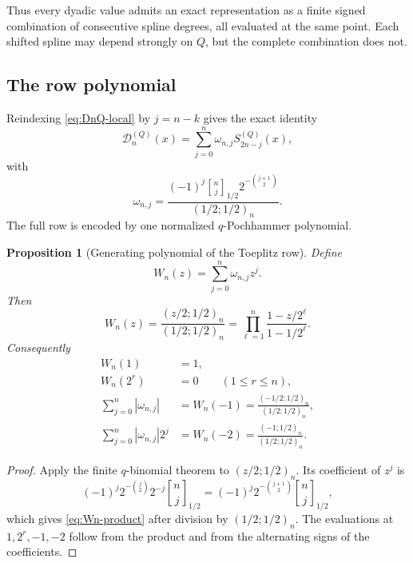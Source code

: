 \documentclass[11pt,oneside]{article}
\newtheorem{proposition}[theorem]{Proposition}
\theoremstyle{definition}
\theoremstyle{remark}
\newcommand{\qbinom}[3]{\genfrac{[}{]}{0pt}{}{#1}{#2}_{#3}}
\begin{document}
Thus every dyadic value admits an exact representation as a finite signed combination of
consecutive spline degrees, all evaluated at the same point.  Each shifted spline may depend
strongly on $Q$, but the complete combination does not.

\subsection{The row polynomial}

Reindexing \eqref{eq:DnQ-local} by $j=n-k$ gives the exact identity
\begin{equation}
 \mathcal D_n^{(Q)}(x)=
 \sum_{j=0}^{n}\omega_{n,j}S_{2n-j}^{(Q)}(x),              \label{eq:D-toeplitz-local}
\end{equation}
with
\begin{equation}
 \omega_{n,j}=
 \frac{(-1)^j\qbinom nj{1/2}2^{-\binom{j+1}{2}}}
 {(1/2;1/2)_n}.                                           \label{eq:omega-local}
\end{equation}
The full row is encoded by one normalized $q$-Pochhammer polynomial.

\begin{proposition}[Generating polynomial of the Toeplitz row]
\label{prop:Wn}
Define
\begin{equation}
 W_n(z)=\sum_{j=0}^{n}\omega_{n,j}z^j.                    \label{eq:Wn-def}
\end{equation}
Then
\begin{equation}
 \boxed{
 W_n(z)=\frac{(z/2;1/2)_n}{(1/2;1/2)_n}
 =\prod_{\ell=1}^{n}\frac{1-z/2^\ell}{1-1/2^\ell}.}      \label{eq:Wn-product}
\end{equation}
Consequently
\begin{align}
 W_n(1)&=1,                                                \label{eq:Wn-one}\\
 W_n(2^r)&=0\qquad(1\le r\le n),                         \label{eq:Wn-roots}\\
 \sum_{j=0}^{n}|\omega_{n,j}|
 &=W_n(-1)=\frac{(-1/2;1/2)_n}{(1/2;1/2)_n},              \label{eq:Wn-variation}\\
 \sum_{j=0}^{n}|\omega_{n,j}|2^j
 &=W_n(-2)=\frac{(-1;1/2)_n}{(1/2;1/2)_n}.                \label{eq:Wn-weighted-variation}
\end{align}
\end{proposition}

\begin{proof}
Apply the finite $q$-binomial theorem to $(z/2;1/2)_n$.  Its coefficient of $z^j$ is
\[
 (-1)^j2^{-\binom j2}2^{-j}\qbinom nj{1/2}
 =(-1)^j2^{-\binom{j+1}{2}}\qbinom nj{1/2},
\]
which gives \eqref{eq:Wn-product} after division by $(1/2;1/2)_n$.  The evaluations at
$1,2^r,-1,-2$ follow from the product and from the alternating signs of the coefficients.
\end{proof}
\end{document}
